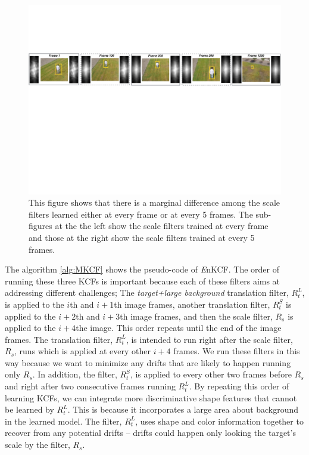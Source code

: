 \documentclass[10pt,twocolumn,letterpaper]{article}
\begin{document}
\begin{figure}[!h]
\centering
\includegraphics[width=1\textwidth]{./figures/LearnedFiltersComparison2.pdf}
\caption{This figure shows that there is a marginal difference among
  the scale filters learned either at every frame or at every 5
  frames. The sub-figures at the the left show the scale filters
  trained at every frame and those at the right show the scale filters
  trained at every 5 frames.}
\label{fig:Filters_Comparison}
\end{figure}

The algorithm \ref{alg:MKCF} shows the pseudo-code of {\it E}nKCF.
The order of running these three KCFs is important because each of
these filters aims at addressing different challenges; The
\textit{target+large background} translation filter, $R_{t}^{L}$, is
applied to the $i$th and $i+1$th image frames, another translation
filter, $R_{t}^{S}$ is applied to the $i+2$th and $i+3$th image
frames, and then the scale filter, $R_{s}$ is applied to the $i+4$the
image. This order repeats until the end of the image frames. The
translation filter, $R_{t}^{L}$, is intended to run right after the
scale filter, $R_s$, runs which is applied at every other $i+4$
frames. We run these filters in this way because we want to minimize
any drifts that are likely to happen running only $R_{s}$. In
addition, the filter, $R_{t}^{S}$, is applied to every other two
frames before $R_{s}$ and right after two consecutive frames running
$R_{t}^{L}$. By repeating this order of learning KCFs, we can
integrate more discriminative shape features that cannot be learned by
$R_{t}^{L}$. This is because it incorporates a large area about
background in the learned model. The filter, $R_{t}^{L}$, uses shape
and color information together to recover from any potential drifts --
drifts could happen only looking the target's scale by the filter,
$R_{s}$.
\end{document}

